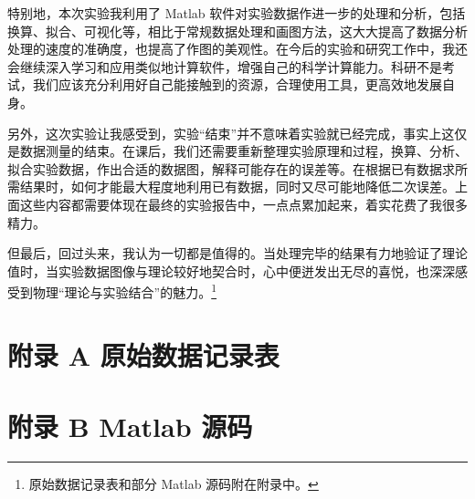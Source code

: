 \documentclass[UTF8]{article}
\theoremstyle{MyLineTheoremStyle} %
\theoremstyle{MyBlockTheoremStyle} %
\theoremstyle{MySubsubsectionStyle} %
\begin{document}
特别地，本次实验我利用了 Matlab 软件对实验数据作进一步的处理和分析，包括换算、拟合、可视化等，相比于常规数据处理和画图方法，这大大提高了数据分析处理的速度的准确度，也提高了作图的美观性。在今后的实验和研究工作中，我还会继续深入学习和应用类似地计算软件，增强自己的科学计算能力。科研不是考试，我们应该充分利用好自己能接触到的资源，合理使用工具，更高效地发展自身。

另外，这次实验让我感受到，实验“结束”并不意味着实验就已经完成，事实上这仅是数据测量的结束。在课后，我们还需要重新整理实验原理和过程，换算、分析、拟合实验数据，作出合适的数据图，解释可能存在的误差等。在根据已有数据求所需结果时，如何才能最大程度地利用已有数据，同时又尽可能地降低二次误差。上面这些内容都需要体现在最终的实验报告中，一点点累加起来，着实花费了我很多精力。

但最后，回过头来，我认为一切都是值得的。当处理完毕的结果有力地验证了理论值时，当实验数据图像与理论较好地契合时，心中便迸发出无尽的喜悦，也深深感受到物理“理论与实验结合”的魅力。\footnote{原始数据记录表和部分 Matlab 源码附在附录中。}














\newpage
\section*{附录 A\hspace*{20pt} 原始数据记录表}
\thispagestyle{fancy} 

\begin{figure}[H]\centering
    
\end{figure}



% 

\section*{附录 B\hspace*{20pt} Matlab 源码}
\thispagestyle{fancy} 

\end{document}

